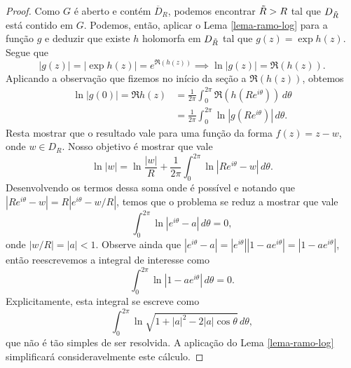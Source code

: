 \begin{proof}
        Como $G$ é aberto e contém $\overline{D}_R$, podemos encontrar $\Tilde{R}>R$
        tal que $D_{\Tilde{R}}$ está contido em $G$. Podemos, então, aplicar o 
        Lema \ref{lema-ramo-log} para a função $g$ e deduzir que existe $h$ holomorfa
        em $D_{\Tilde{R}}$ tal que $g(z) = \exp{h(z)}$. Segue que
        \begin{equation*}
            |g(z)| = |\exp{h(z)}| = e^{\Re{(h(z))}} 
            \implies \ln{|g(z)|} = \Re{(h(z))}.
        \end{equation*}
        Aplicando a observação que fizemos no início da seção a $\Re{(h(z))}$, 
        obtemos
        \begin{align*}
            \ln{|g(0)|} = \Re{h(z)} &= \frac{1}{2\pi} 
            \int_{0}^{2\pi}\Re{(h(Re^{i\theta}))} \, d\theta \\
            &= \frac{1}{2\pi}\int_{0}^{2\pi}\ln{|g(Re^{i\theta})|} \, d\theta.
        \end{align*}
        Resta mostrar que o resultado vale para uma função da forma $f(z) = z - w$,
        onde $w \in D_R$. Nosso objetivo é mostrar que vale
        \begin{equation*}
            \ln{|w|} = \ln{\frac{|w|}{R}} 
            + \frac{1}{2\pi}\int_{0}^{2\pi}\ln{|Re^{i\theta} - w|} \, d\theta.
        \end{equation*}
        Desenvolvendo os termos dessa soma onde é possível e notando que
        $|Re^{i\theta} - w| = R|e^{i\theta} - w/R|$, temos que o problema se 
        reduz a mostrar que vale
        \begin{equation*}
            \int_{0}^{2\pi}\ln{|e^{i\theta} - a|} \, d\theta = 0,
        \end{equation*}
        onde $|w/R| = |a| < 1$. Observe ainda que 
        $|e^{i\theta} - a| = |e^{i\theta}||1-ae^{i\theta}| = |1-ae^{i\theta}|$, 
        então reescrevemos a integral de interesse como
        \begin{equation*}
            \int_{0}^{2\pi}\ln{|1 - ae^{i\theta}|} \, d\theta = 0.
        \end{equation*}
        Explicitamente, esta integral se escreve como
        \begin{equation*}
            \int_{0}^{2\pi}\ln{\sqrt{1 + |a|^2 - 2|a|\cos{\theta}}} \, d\theta,
        \end{equation*}
        que não é tão simples de ser resolvida. A aplicação do 
        Lema \ref{lema-ramo-log} simplificará consideravelmente este cálculo. 
        

\end{proof}
